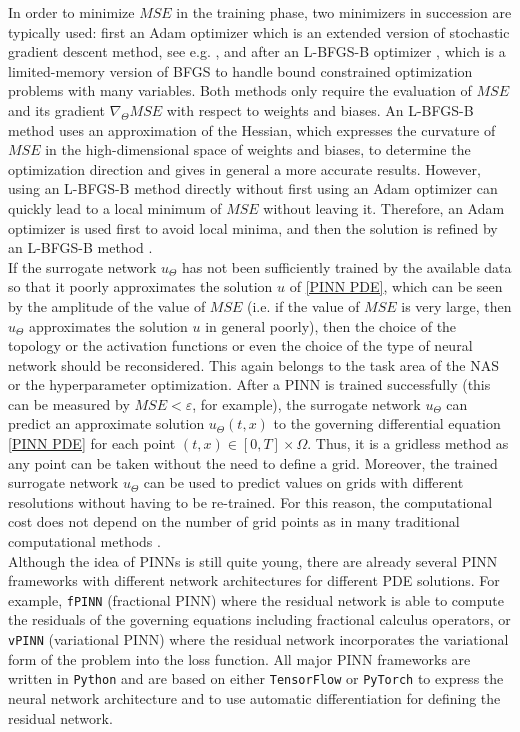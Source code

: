 In order to minimize $MSE$ in the training phase, two minimizers in succession are typically used: first an Adam optimizer which is an extended version of stochastic gradient descent method, see e.g. \cite{KingmaBa:2017}, and after an L-BFGS-B optimizer \cite{ByrdLuNocedalZhu:1995}, which is a limited-memory version of BFGS to handle bound constrained optimization problems with many variables. Both methods only require the evaluation of $MSE$ and its gradient $\nabla_\Theta MSE$ with respect to weights and biases. An L-BFGS-B method uses an approximation of the Hessian, which expresses the curvature of $MSE$ in the high-dimensional space of weights and biases, to determine the optimization direction and gives in general a more accurate results. However, using an L-BFGS-B method directly without first using an Adam optimizer can quickly lead to a local minimum of $MSE$ without leaving it. Therefore, an Adam optimizer is used first to avoid local minima, and then the solution is refined by an L-BFGS-B method \cite[p.~6]{Markidis:2021}. \\
If the surrogate network $u_\Theta$ has not been sufficiently trained by the available data so that it poorly approximates the solution $u$ of \cref{PINN PDE}, which can be seen by the amplitude of the value of $MSE$ (i.e. if the value of $MSE$ is very large, then $u_\Theta$ approximates the solution $u$ in general poorly), then the choice of the topology or the activation functions or even the choice of the type of neural network should be reconsidered. This again belongs to the task area of the NAS or the hyperparameter optimization. After a PINN is trained successfully (this can be measured by $MSE < \varepsilon$, for example), the surrogate network $u_\Theta$ can predict an approximate solution $u_\Theta (t,x)$ to the governing differential equation \cref{PINN PDE} for each point $(t,x) \in \left[ 0, T \right] \times \Omega$. Thus, it is a gridless method as any point can be taken without the need to define a grid. Moreover, the trained surrogate network $u_\Theta$ can be used to predict values on grids with different resolutions without having to be re-trained. For this reason, the computational cost does not depend on the number of grid points as in many traditional computational methods \cite[p.~2]{Markidis:2021}. \\
Although the idea of PINNs is still quite young, there are already several PINN frameworks with different network architectures for different PDE solutions. For example, \lstinline!fPINN! (fractional PINN) where the residual network is able to compute the residuals of the governing equations including fractional calculus operators, or \lstinline!vPINN! (variational PINN) where the residual network incorporates the variational form of the problem into the loss function. All major PINN frameworks are written in \lstinline!Python! and are based on either \lstinline!TensorFlow! or \lstinline!PyTorch! to express the neural network architecture and to use automatic differentiation for defining the residual network. 